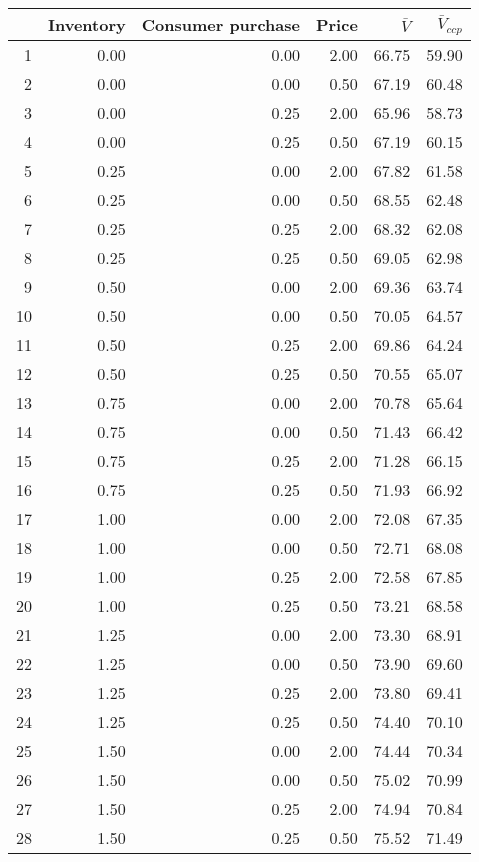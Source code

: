 \begin{tabular}{rrrrrr}
  \hline
 & Inventory & Consumer purchase & Price & $\bar{V}$ & $\bar{V}_{ccp}$ \\ 
  \hline
1 & 0.00 & 0.00 & 2.00 & 66.75 & 59.90 \\ 
  2 & 0.00 & 0.00 & 0.50 & 67.19 & 60.48 \\ 
  3 & 0.00 & 0.25 & 2.00 & 65.96 & 58.73 \\ 
  4 & 0.00 & 0.25 & 0.50 & 67.19 & 60.15 \\ 
  5 & 0.25 & 0.00 & 2.00 & 67.82 & 61.58 \\ 
  6 & 0.25 & 0.00 & 0.50 & 68.55 & 62.48 \\ 
  7 & 0.25 & 0.25 & 2.00 & 68.32 & 62.08 \\ 
  8 & 0.25 & 0.25 & 0.50 & 69.05 & 62.98 \\ 
  9 & 0.50 & 0.00 & 2.00 & 69.36 & 63.74 \\ 
  10 & 0.50 & 0.00 & 0.50 & 70.05 & 64.57 \\ 
  11 & 0.50 & 0.25 & 2.00 & 69.86 & 64.24 \\ 
  12 & 0.50 & 0.25 & 0.50 & 70.55 & 65.07 \\ 
  13 & 0.75 & 0.00 & 2.00 & 70.78 & 65.64 \\ 
  14 & 0.75 & 0.00 & 0.50 & 71.43 & 66.42 \\ 
  15 & 0.75 & 0.25 & 2.00 & 71.28 & 66.15 \\ 
  16 & 0.75 & 0.25 & 0.50 & 71.93 & 66.92 \\ 
  17 & 1.00 & 0.00 & 2.00 & 72.08 & 67.35 \\ 
  18 & 1.00 & 0.00 & 0.50 & 72.71 & 68.08 \\ 
  19 & 1.00 & 0.25 & 2.00 & 72.58 & 67.85 \\ 
  20 & 1.00 & 0.25 & 0.50 & 73.21 & 68.58 \\ 
  21 & 1.25 & 0.00 & 2.00 & 73.30 & 68.91 \\ 
  22 & 1.25 & 0.00 & 0.50 & 73.90 & 69.60 \\ 
  23 & 1.25 & 0.25 & 2.00 & 73.80 & 69.41 \\ 
  24 & 1.25 & 0.25 & 0.50 & 74.40 & 70.10 \\ 
  25 & 1.50 & 0.00 & 2.00 & 74.44 & 70.34 \\ 
  26 & 1.50 & 0.00 & 0.50 & 75.02 & 70.99 \\ 
  27 & 1.50 & 0.25 & 2.00 & 74.94 & 70.84 \\ 
  28 & 1.50 & 0.25 & 0.50 & 75.52 & 71.49 \\ 

\end{tabular}

